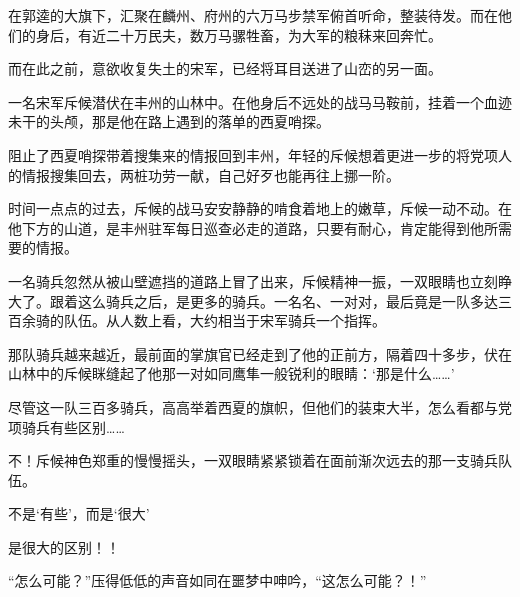 在郭逵的大旗下，汇聚在麟州、府州的六万马步禁军俯首听命，整装待发。而在他们的身后，有近二十万民夫，数万马骡牲畜，为大军的粮秣来回奔忙。

而在此之前，意欲收复失土的宋军，已经将耳目送进了山峦的另一面。

一名宋军斥候潜伏在丰州的山林中。在他身后不远处的战马马鞍前，挂着一个血迹未干的头颅，那是他在路上遇到的落单的西夏哨探。

阻止了西夏哨探带着搜集来的情报回到丰州，年轻的斥候想着更进一步的将党项人的情报搜集回去，两桩功劳一献，自己好歹也能再往上挪一阶。

时间一点点的过去，斥候的战马安安静静的啃食着地上的嫩草，斥候一动不动。在他下方的山道，是丰州驻军每日巡查必走的道路，只要有耐心，肯定能得到他所需要的情报。

一名骑兵忽然从被山壁遮挡的道路上冒了出来，斥候精神一振，一双眼睛也立刻睁大了。跟着这么骑兵之后，是更多的骑兵。一名名、一对对，最后竟是一队多达三百余骑的队伍。从人数上看，大约相当于宋军骑兵一个指挥。

那队骑兵越来越近，最前面的掌旗官已经走到了他的正前方，隔着四十多步，伏在山林中的斥候眯缝起了他那一对如同鹰隼一般锐利的眼睛：‘那是什么……’

尽管这一队三百多骑兵，高高举着西夏的旗帜，但他们的装束大半，怎么看都与党项骑兵有些区别……

不！斥候神色郑重的慢慢摇头，一双眼睛紧紧锁着在面前渐次远去的那一支骑兵队伍。

不是‘有些’，而是‘很大’

是很大的区别！！

“怎么可能？”压得低低的声音如同在噩梦中呻吟，“这怎么可能？！”

